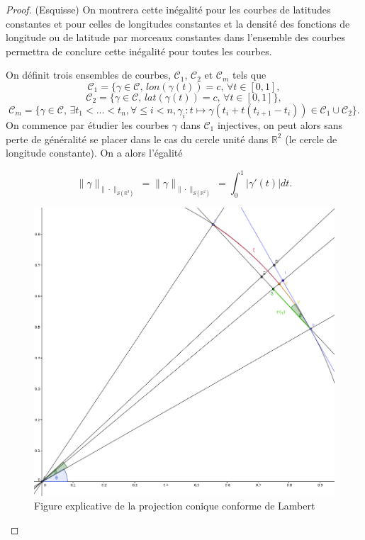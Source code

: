 \documentclass[a4paper,11pt]{article}
\numberwithin{equation}{section}
\begin{document}
\begin{proof} (Esquisse) On montrera cette inégalité pour les courbes de latitudes constantes et pour celles de longitudes constantes et la densité des fonctions de longitude ou de latitude par morceaux constantes dans l'ensemble des courbes permettra de conclure cette inégalité pour toutes les courbes.
	
\vspace{4mm}
	
On définit trois ensembles de courbes, $\mathcal{C}_1$, $\mathcal{C}_2$ et $\mathcal{C}_{m}$ tels que \[\mathcal{C}_1=\{\gamma \in \mathcal{C},\, lon(\gamma(t))=c, \, \forall t \in [0,1],\]
\[\mathcal{C}_2=\{\gamma \in \mathcal{C},\, lat(\gamma(t))=c, \, \forall t \in [0,1]\},\]
\[\mathcal{C}_m=\{\gamma \in \mathcal{C},\, \exists t_1<...<t_n,\forall \leq i<n, \gamma_i: t \mapsto \gamma(t_i+ t(t_{i+1}-t_i)) \in \mathcal{C}_1 \cup \mathcal{C}_2\}.\]
On commence par étudier les courbes $\gamma$ dans $\mathcal{C}_1$ injectives, on peut alors sans perte de généralité se placer dans le cas du cercle unité dans $\mathbb{R}^2$ (le cercle de longitude constante). On a alors l'égalité
	
\[\|\gamma\|_{\|\cdot\|_{S(\mathbb{R}^3)}}=\|\gamma\|_{\|\cdot\|_{S(\mathbb{R}^2)}}=\int_{0}^{1}|\gamma'(t)|dt.\]
\begin{figure}[H]
	\label{fig-Lambert schema exp }
	\begin{center}
		\includegraphics[scale=0.25]{geogebra_lambert.png}
	\end{center}
	\caption{Figure explicative de la projection conique conforme de Lambert}
\end{figure}
	

\end{proof}
\end{document}
